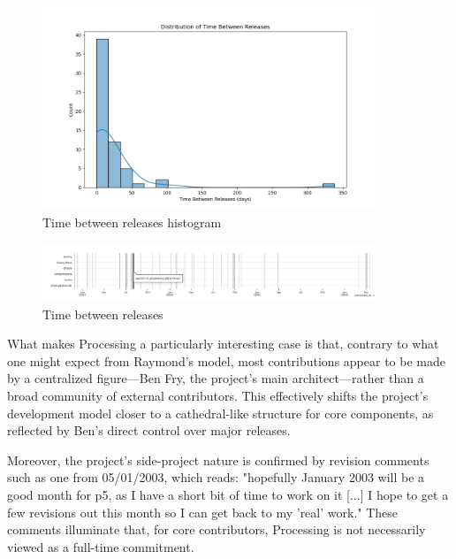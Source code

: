 \begin{figure}[h!] 
  \centering
  \includegraphics[width=0.9\textwidth]{images/time_between_releases_histogram.png} 
  \caption{Time between releases histogram}
  \label{fig:releases_frequency_histogram}
\end{figure}

\begin{figure}[h!] 
  \centering
  \includegraphics[width=0.9\textwidth]{images/releases-lines.png} 
  \caption{Time between releases}
  \label{fig:releases-lines}
\end{figure}

What makes Processing a particularly interesting case is that, contrary to what one might expect from Raymond's model, most contributions appear to be made by a centralized figure—Ben Fry, the project's main architect—rather than a broad community of external contributors. This effectively shifts the project's development model closer to a cathedral-like structure for core components, as reflected by Ben's direct control over major releases. 

Moreover, the project’s side-project nature is confirmed by revision comments such as one from 05/01/2003, which reads: "hopefully January 2003 will be a good month for p5, as I have a short bit of time to work on it [...] I hope to get a few revisions out this month so I can get back to my 'real' work." These comments illuminate that, for core contributors, Processing is not necessarily viewed as a full-time commitment.

